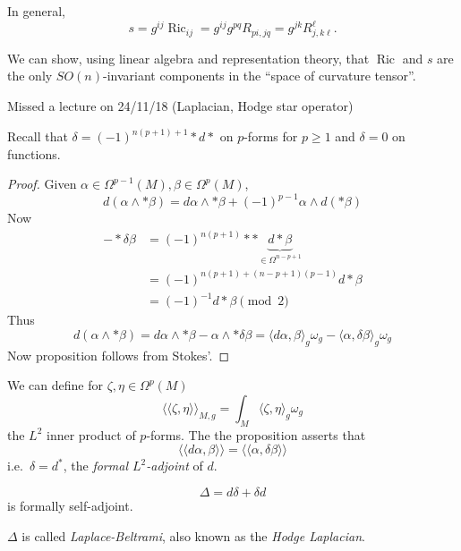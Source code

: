\documentclass[a4paper]{article}
\newcommand{\w}{\wedge}
\DeclareMathOperator{\Ric}{Ric} %
\begin{document}
In general,
\[
  s = g^{ij} \Ric_{ij} = g^{ij} g^{pq} R_{pi, jq} = g^{j k} R^\ell_{j, k \ell}.
\]

We can show, using linear algebra and representation theory, that \(\Ric\) and \(s\) are the only \(SO(n)\)-invariant components in the ``space of curvature tensor''.

Missed a lecture on 24/11/18 (Laplacian, Hodge star operator)

Recall that \(\delta = (-1)^{n(p + 1) + 1} * d *\) on \(p\)-forms for \(p \geq 1\) and \(\delta = 0\) on functions.

\begin{proof}
  Given \(\alpha \in \Omega^{p - 1}(M), \beta \in \Omega^p(M)\),
  \[
    d(\alpha \w * \beta)
    = d\alpha \w * \beta + (-1)^{p - 1} \alpha \w d (*\beta)
  \]
  Now
  \begin{align*}
    - * \delta \beta
    &= (-1)^{n (p + 1)} ** \underbrace{d* \beta}_{\in \Omega^{n - p + 1}} \\
    &= (-1)^{n(p + 1) + (n - p + 1)(p - 1)} d *\beta \\
    &= (-1)^{- 1} d*\beta \pmod 2
  \end{align*}
  Thus
  \[
    d(\alpha \w *\beta)
    = d\alpha \w * \beta - \alpha \w * \delta \beta
    = \langle d\alpha, \beta\rangle_g \omega_g - \langle \alpha, \delta \beta \rangle_g \omega_g
  \]
  Now proposition follows from Stokes'.
\end{proof}

\begin{remark}
  We can define for \(\zeta, \eta \in \Omega^p(M)\)
  \[
    \langle \langle \zeta, \eta \rangle\rangle_{M, g} = \int_M \langle \zeta, \eta \rangle_g \omega_g
  \]
  the \(L^2\) inner product of \(p\)-forms. The the proposition asserts that
  \[
    \langle\langle d\alpha, \beta \rangle\rangle = \langle \langle \alpha, \delta \beta\rangle\rangle
  \]
  i.e.\ \(\delta = d^*\), the \emph{formal \(L^2\)-adjoint} of \(d\).
\end{remark}

\begin{corollary}
  \[
    \Delta = d \delta + \delta d
  \]
  is formally self-adjoint.
\end{corollary}

\begin{definition}
  \(\Delta\) is called \emph{Laplace-Beltrami}, also known as the \emph{Hodge Laplacian}.
\end{definition}
\end{document}
